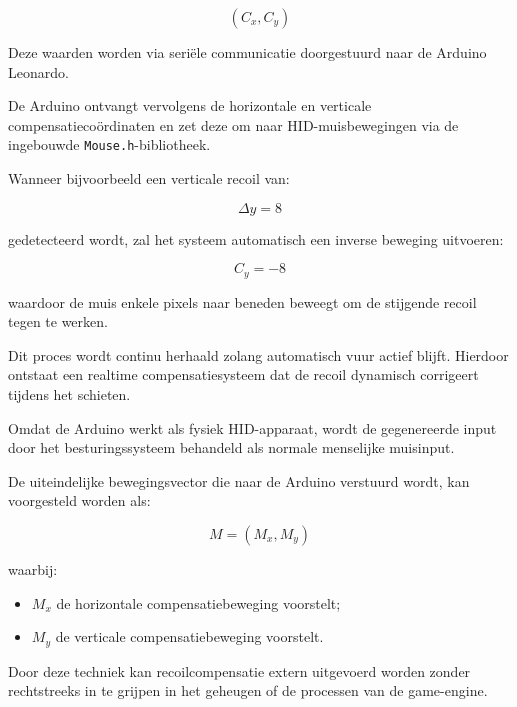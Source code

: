 \[
(C_x, C_y)
\]

Deze waarden worden via seriële communicatie doorgestuurd naar de Arduino Leonardo.

De Arduino ontvangt vervolgens de horizontale en verticale compensatiecoördinaten en zet deze om naar HID-muisbewegingen via de ingebouwde \texttt{Mouse.h}-bibliotheek.

Wanneer bijvoorbeeld een verticale recoil van:

\[
\Delta y = 8
\]

gedetecteerd wordt, zal het systeem automatisch een inverse beweging uitvoeren:

\[
C_y = -8
\]

waardoor de muis enkele pixels naar beneden beweegt om de stijgende recoil tegen te werken.

Dit proces wordt continu herhaald zolang automatisch vuur actief blijft. Hierdoor ontstaat een realtime compensatiesysteem dat de recoil dynamisch corrigeert tijdens het schieten.

Omdat de Arduino werkt als fysiek HID-apparaat, wordt de gegenereerde input door het besturingssysteem behandeld als normale menselijke muisinput.

De uiteindelijke bewegingsvector die naar de Arduino verstuurd wordt, kan voorgesteld worden als:

\[
M = (M_x, M_y)
\]

waarbij:
\begin{itemize}
    \item \(M_x\) de horizontale compensatiebeweging voorstelt;
    \item \(M_y\) de verticale compensatiebeweging voorstelt.
\end{itemize}

Door deze techniek kan recoilcompensatie extern uitgevoerd worden zonder rechtstreeks in te grijpen in het geheugen of de processen van de game-engine.